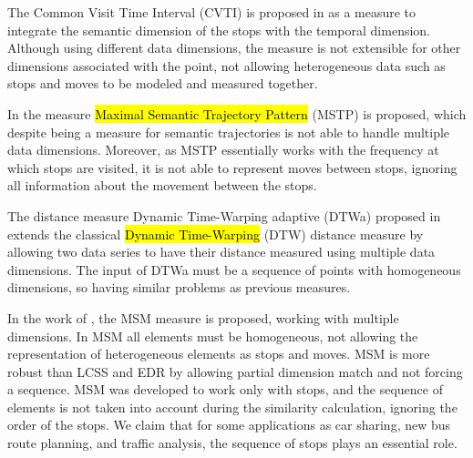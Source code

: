 \documentclass[12pt]{article}
\begin{document}

The Common Visit Time Interval (CVTI) is proposed in \cite{Kang:2009:SMT:1529282.1529580} as a measure to integrate the semantic dimension of the stops with the temporal dimension. Although using different data dimensions, the measure is not extensible for other dimensions associated with the point, not allowing heterogeneous data such as stops and moves to be modeled and measured together.

In \cite{Ying:2010:MUS:1867699.1867703} the measure \hl{Maximal Semantic Trajectory Pattern} (MSTP) is proposed, which despite being a measure for semantic trajectories is not able to handle multiple data dimensions. Moreover, as MSTP essentially works with the frequency at which stops are visited, it is not able to represent moves between stops, ignoring all information about the movement between the stops.

The distance measure Dynamic Time-Warping adaptive (DTWa) proposed in \cite{Shokoohi-Yekta2017} extends the classical \hl{Dynamic Time-Warping} (DTW) \cite{berndt1994using} distance measure by allowing two data series to have their distance measured using multiple data dimensions. The input of DTWa must be a sequence of points with homogeneous dimensions, so having similar problems as previous measures.

In the work of \cite{Furtado:TGIS12156}, the MSM measure is proposed, working with multiple dimensions. In MSM all elements must be homogeneous, not allowing the representation of heterogeneous elements as stops and moves. MSM is more robust than LCSS and EDR by allowing partial dimension match and not forcing a sequence. MSM was developed to work only with stops, and the sequence of elements is not taken into account during the similarity calculation, ignoring the order of the stops. We claim that for some applications as car sharing, new bus route planning, and traffic analysis, the sequence of stops plays an essential role.
\end{document}
